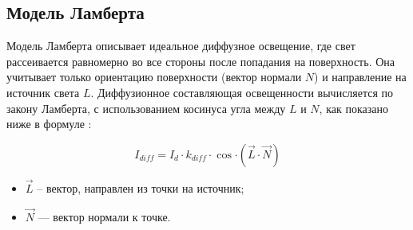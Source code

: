 %
%
%
%

\subsection{Модель Ламберта}

Модель Ламберта описывает идеальное диффузное освещение, где свет рассеивается равномерно во все стороны после попадания на поверхность. \cite{lightmodf} Она учитывает только ориентацию поверхности (вектор нормали $N$) и направление на источник света $L$. Диффузионное составляющая освещенности вычисляется по закону Ламберта, с использованием косинуса угла между $L$ и $N$, как показано ниже в формуле \cite{lightmodfv}:


\begin{equation}\label{lamber}
	I_{diff}=I_{d} \cdot k_{diff} \cdot \cos{\cdot (\vec L \cdot \vec N)}
\end{equation}

\begin{itemize}
	\item $\vec L$ -- вектор, направлен из точки на источник;
	\item $\vec N$ --- вектор нормали к точке.
\end{itemize}



